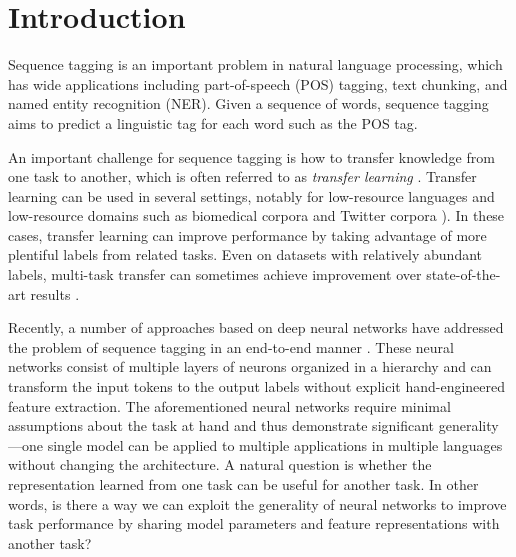 
\section{Introduction}

Sequence tagging is an important problem in natural language processing, which has wide applications including part-of-speech (POS) tagging, text chunking, and named entity recognition (NER).  Given a sequence of words, sequence tagging aims to predict a linguistic tag for each word such as the POS tag.

An important challenge for sequence tagging is how to transfer knowledge from one task to another, which is often referred to as \textit{transfer learning} \citep{pan2010survey}.
Transfer learning can be used in several settings, notably for low-resource languages \citep{zirikly2cross,wang2013cross} and low-resource domains such as biomedical corpora \citep{kim2003genia} and Twitter corpora \citep{ritter2011named}). In these cases, transfer learning can improve performance by taking advantage of more plentiful labels from related tasks. Even on datasets with relatively abundant labels, multi-task transfer can sometimes achieve improvement over state-of-the-art results \citep{collobert2011natural}.

Recently, a number of approaches based on deep neural networks have addressed the problem of sequence tagging in an end-to-end manner \citep{collobert2011natural,lample2016neural,ling2015finding,ma2016end}. These neural networks consist of multiple layers of neurons organized in a hierarchy and can transform the input tokens to the output labels without explicit hand-engineered feature extraction. The aforementioned neural networks require minimal assumptions about the task at hand and thus demonstrate significant generality---one single model can be applied to multiple applications in multiple languages without changing the architecture. A natural question is whether the representation learned from one task can be useful for another task. In other words, is there a way we can exploit the generality of neural networks to improve task performance by sharing model parameters and feature representations with another task?

